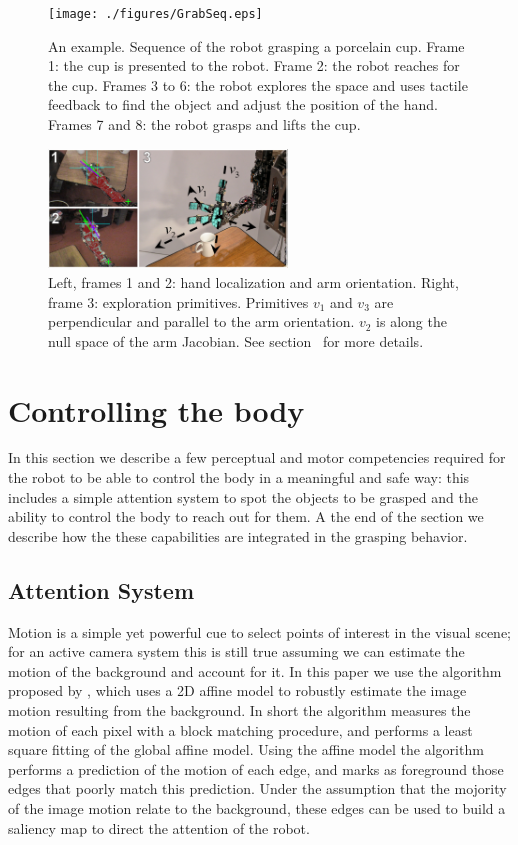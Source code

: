 \begin{figure}[tb]
\centerline{
\texttt{[image: ./figures/GrabSeq.eps]}
} \caption{An example. Sequence of the robot grasping a porcelain
cup. Frame 1: the cup is presented to the robot. Frame 2: the
robot reaches for the cup. Frames 3 to 6:  the robot explores the
space and uses tactile feedback to find the object and adjust the
position of the hand. Frames 7 and 8: the robot grasps
and lifts the cup.} \label{fig:sequence}
\end{figure}

\begin{figure}[tb]
  \centerline{
    \includegraphics[width=2.5in, angle=0 ]{./figures/expl-directions.eps}
  }\caption{Left, frames 1 and 2: hand localization and arm 
    orientation. Right, frame 3: exploration primitives. Primitives $v_1$ 
and $v_3$ are perpendicular and parallel to the arm orientation. $v_2$ is 
along the null space of the arm Jacobian. See section~\cite{sec:controlling} for
 more details.}
\label{fig:expl-directions}
\end{figure}

\section{Controlling the body}
\label{sec:controlling}

In this section we describe a few perceptual and motor competencies required 
for the robot to be able to control the body in a meaningful and safe way: 
this includes a simple attention system to spot the objects to be grasped 
and the ability to control the body to reach out for them. A the end of the
section we describe how the these capabilities are integrated in the grasping 
behavior.

\subsection{Attention System}
Motion is a simple yet powerful cue to select points of interest in the visual
scene; for an active camera system this is still true assuming we can estimate 
the motion of the background and account for it. In this paper we use the 
algorithm proposed by \cite{kemp-thesis}, which uses a 2D affine model to 
robustly estimate the image motion resulting from the background. In short the 
algorithm measures the motion of each pixel with a block matching procedure, and 
performs a least square fitting of the global affine model. Using the affine model
the algorithm performs a prediction of the motion of each edge, and marks as 
foreground those edges that poorly match this prediction. Under the assumption 
that the mojority of the image motion relate to the background, these edges 
can be used to build a saliency map to direct the attention of the robot. 

